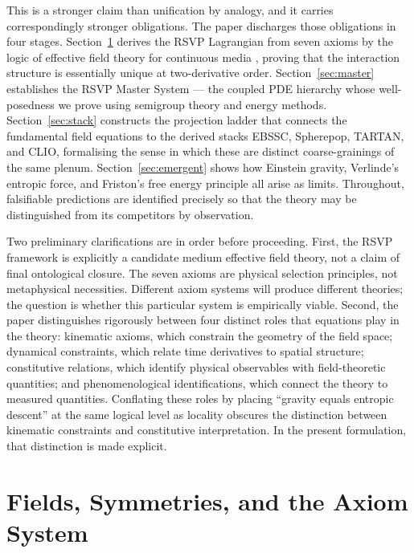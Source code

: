 \documentclass[12pt, a4paper]{article}
\theoremstyle{plain}
\theoremstyle{definition}
\theoremstyle{remark}
\begin{document}
This is a stronger claim than unification by analogy, and it carries correspondingly stronger
obligations.  The paper discharges those obligations in four stages.  Section~\ref{sec:axioms}
derives the RSVP Lagrangian from seven axioms by the logic of effective field theory
for continuous media \cite{Nicolis2013, Endlich2013, Andersson2007}, proving that the
interaction structure is essentially unique at two-derivative order.  Section~\ref{sec:master}
establishes the RSVP Master System --- the coupled PDE hierarchy whose well-posedness we
prove using semigroup theory and energy methods.  Section~\ref{sec:stack} constructs the
projection ladder that connects the fundamental field equations to the derived stacks EBSSC,
Spherepop, TARTAN, and CLIO, formalising the sense in which these are distinct
coarse-grainings of the same plenum.  Section~\ref{sec:emergent} shows how Einstein gravity,
Verlinde's entropic force, and Friston's free energy principle all arise as limits.  Throughout,
falsifiable predictions are identified precisely so that the theory may be distinguished from
its competitors by observation.

Two preliminary clarifications are in order before proceeding.  First, the RSVP framework
is explicitly a candidate medium effective field theory, not a claim of final ontological
closure.  The seven axioms are physical selection principles, not metaphysical necessities.
Different axiom systems will produce different theories; the question is whether this
particular system is empirically viable.  Second, the paper distinguishes rigorously
between four distinct roles that equations play in the theory: kinematic axioms, which
constrain the geometry of the field space; dynamical constraints, which relate time
derivatives to spatial structure; constitutive relations, which identify physical observables
with field-theoretic quantities; and phenomenological identifications, which connect the
theory to measured quantities.  Conflating these roles by placing ``gravity equals entropic descent'' at the same logical level as locality obscures the distinction between kinematic constraints and constitutive interpretation. In the present formulation, that distinction is made explicit.

\section{Fields, Symmetries, and the Axiom System}
\label{sec:axioms}
\end{document}
